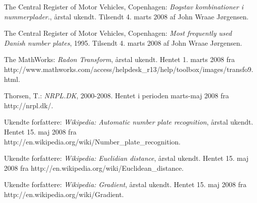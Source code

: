 \documentclass[11pt,a4paper,final]{article}
\begin{document}
\begin{thebibliography}{99}
 The Central Register of Motor Vehicles, Copenhagen: \textit{Bogstav kombinationer i nummerplader.}, årstal ukendt. Tilsendt 4. marts 2008 af John Wraae Jørgensen.

 The Central Register of Motor Vehicles, Copenhagen: \textit{Most frequently used Danish number plates}, 1995. Tilsendt 4. marts 2008 af John Wraae Jørgensen.

 The MathWorks: \textit{Radon Transform}, årstal ukendt. Hentet 1. marts 2008 fra http://www.mathworks.com/access/helpdesk\_r13/help/toolbox/images/transfo9.html.

 Thorsen, T.: \textit{NRPL.DK}, 2000-2008. Hentet i perioden marts-maj 2008 fra http://nrpl.dk/.

 Ukendte forfattere: \textit{Wikipedia: Automatic number plate recognition}, årstal ukendt. Hentet 15. maj 2008 fra http://en.wikipedia.org/wiki/Number\_plate\_recognition.

 Ukendte forfattere: \textit{Wikipedia: Euclidian distance}, årstal ukendt. Hentet 15. maj 2008 fra http://en.wikipedia.org/wiki/Euclidean\_distance.

 Ukendte forfattere: \textit{Wikipedia: Gradient}, årstal ukendt. Hentet 15. maj 2008 fra http://en.wikipedia.org/wiki/Gradient.









\end{thebibliography}
\end{document}
